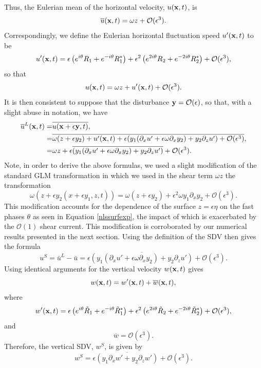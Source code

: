\documentclass{JFM_Style/jfm}
\newcommand{\pd}{\partial}
\begin{document}
Thus, the Eulerian mean of the horizontal velocity, $u({\bf x},t)$, is  
\[
\overline{u}({\bf x},t) = \omega z + \mathcal{O}(\epsilon^{3}).
\]
Correspondingly, we define the Eulerian horizontal fluctuation speed $u'({\bf x},t)$ to be
\[
u'({\bf x},t) = \epsilon\left(e^{i\theta}R_{1} + e^{-i\theta}R_{1}^{\ast} \right)
+  \epsilon^{2}\left( e^{2i\theta}R_{2} + e^{-2i\theta}R_{2}^{\ast}\right)  + \mathcal{O}(\epsilon^{3}),
\]
so that  
\[
u({\bf x},t) = \omega z +  u'({\bf x},t) + \mathcal{O}(\epsilon^{3}).
\]
It is then consistent to suppose that the disturbance ${\bf y}=\mathcal{O}(\epsilon)$, so that, with a slight abuse in notation, we have 
\begin{align}
\overline{u}^{L}({\bf x},t) = & \overline{u({\bf x} + \epsilon {\bf y},t)}, \nonumber \\
= & \overline{\omega (z + \epsilon y_{2}) +  u'({\bf x},t) + \epsilon (y_{1}(\pd_{x}u'+\epsilon\omega\pd_{x}y_{2}) + y_{2} \pd_{z}u') + \mathcal{O}(\epsilon^{3})}, \nonumber \\
= & \omega z + \epsilon \overline{(y_{1}(\pd_{x}u'+\epsilon\omega\pd_{x}y_{2}) + y_{2}\pd_{z}u')} + \mathcal{O}(\epsilon^{3}). \label{lagrandrift}
\end{align}
Note, in order to derive the above formulas, we used a slight modification of the standard GLM transformation in which we used in the shear term $\omega z$ the transformation
\[
\omega(z+\epsilon y_{2}(x+\epsilon y_{1},z,t)) = \omega (z + \epsilon y_{2}) + \epsilon^{2}\omega y_{1}\pd_{x}y_{2} + \mathcal{O}(\epsilon^{3}).
\]
This modification accounts for the dependence of the surface $z=\epsilon \eta$ on the fast phases $\theta$ as seen in Equation \eqref{nlssurfexp}, the impact of which is exacerbated by the $\mathcal{O}(1)$ shear current.    This modification is corroborated by our numerical results presented in the next section.  Using the definition of the SDV then gives the formula 
\[
u^{S} = \bar{u}^{L} - \bar{u} = \epsilon \overline{(y_{1}(\pd_{x}u'+\epsilon\omega\pd_{x}y_{2}) + y_{2}\pd_{z}u' )} + \mathcal{O}(\epsilon^{3}).
\]
Using identical arguments for the vertical velocity $w({\bf x},t)$ gives 
\[
w({\bf x},t) = w'({\bf x},t) + \overline{w}({\bf x},t),
\]
where 
\[
w'({\bf x},t)= \epsilon\left(e^{i\theta}\tilde{R}_{1} + e^{-i\theta}\tilde{R}_{1}^{\ast} \right)
+  \epsilon^{2}\left( e^{2i\theta}\tilde{R}_{2} + e^{-2i\theta}\tilde{R}_{2}^{\ast}\right)  + \mathcal{O}(\epsilon^{3}),
\]
and 
\[
\overline{w}= \mathcal{O}(\epsilon^{3}).  
\]
Therefore, the vertical SDV, $w^{S}$, is given by
\[
w^{S} = \epsilon \overline{(y_{1}\pd_{x}w'+ y_{2}\pd_{z}w')} + \mathcal{O}(\epsilon^{3}).
\]
\end{document}
